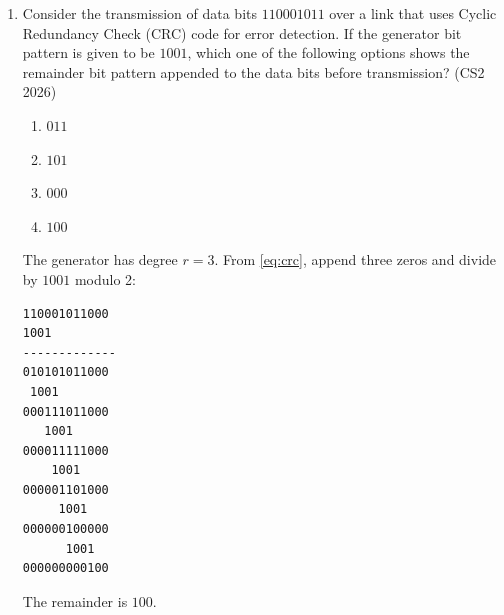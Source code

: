 \begin{enumerate}[label=\thesubsection.\arabic*, ref=\thesubsection.\theenumi]
\textit{Note:} $+$ is OR operation, $.$ is AND operation, $'$ is NOT
operation
\hfill (CS2 2026)
\begin{multicols}{2}
\begin{enumerate}[label=\roman*)]
  \item $A' + B' + C' + D'$
  \item $B'$
  \item $A'.B' + A.B$
  \item $A'$
\end{enumerate}
\end{multicols}
\solution Minterms $0$--$3$ are $00CD$ ($A = 0, B = 0$) and minterms
$8$--$11$ are $10CD$ ($A = 1, B = 0$), with $C, D$ taking all values. So
\begin{align}
F = A'B' + AB' = B'
\end{align}
from \eqref{eq:bool-comb}.

The following code checks every option against the truth table.
\begin{lstlisting}
codes/bool.c
\end{lstlisting}

\item Consider the transmission of data bits $110001011$ over a link that
uses Cyclic Redundancy Check (CRC) code for error detection. If the
generator bit pattern is given to be $1001$, which one of the following
options shows the remainder bit pattern appended to the data bits before
transmission?
\hfill (CS2 2026)
\begin{multicols}{4}
\begin{enumerate}[label=\roman*)]
  \item $011$
  \item $101$
  \item $000$
  \item $100$
\end{enumerate}
\end{multicols}
\solution The generator has degree $r = 3$. From \eqref{eq:crc}, append
three zeros and divide by $1001$ modulo 2:
\par\medskip\noindent\begin{minipage}{\linewidth}
\begin{lstlisting}
110001011000
1001
-------------
010101011000
 1001
000111011000
   1001
000011111000
    1001
000001101000
     1001
000000100000
      1001
000000000100
\end{lstlisting}
\end{minipage}\par\medskip
The remainder is $100$.


\end{enumerate}
